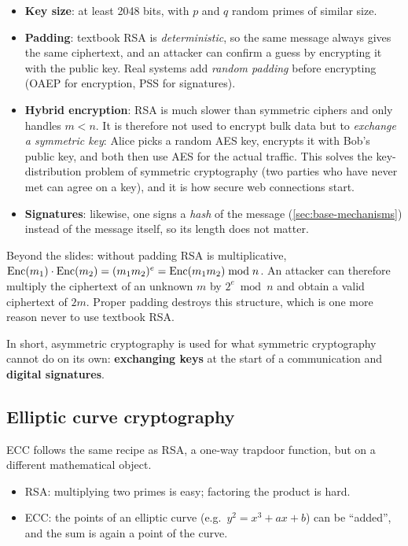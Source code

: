 \begin{itemize}
    \item \textbf{Key size}: at least 2048 bits, with $p$ and $q$ random primes of similar size.
    \item \textbf{Padding}: textbook RSA is \emph{deterministic}, so the same message always gives the same ciphertext, and an attacker can confirm a guess by encrypting it with the public key. Real systems add \emph{random padding} before encrypting (OAEP for encryption, PSS for signatures).
    \item \textbf{Hybrid encryption}: RSA is much slower than symmetric ciphers and only handles $m < n$. It is therefore not used to encrypt bulk data but to \emph{exchange a symmetric key}: Alice picks a random AES key, encrypts it with Bob's public key, and both then use AES for the actual traffic. This solves the key-distribution problem of symmetric cryptography (two parties who have never met can agree on a key), and it is how secure web connections start.
    \item \textbf{Signatures}: likewise, one signs a \emph{hash} of the message (\cref{sec:base-mechanisms}) instead of the message itself, so its length does not matter.
\end{itemize}

\begin{remark}
Beyond the slides: without padding RSA is multiplicative, $\operatorname{Enc}(m_1)\cdot\operatorname{Enc}(m_2) = (m_1 m_2)^e = \operatorname{Enc}(m_1 m_2) \bmod n$. An attacker can therefore multiply the ciphertext of an unknown $m$ by $2^e \bmod n$ and obtain a valid ciphertext of $2m$. Proper padding destroys this structure, which is one more reason never to use textbook RSA.
\end{remark}

In short, asymmetric cryptography is used for what symmetric cryptography cannot do on its own: \textbf{exchanging keys} at the start of a communication and \textbf{digital signatures}.

\subsection{Elliptic curve cryptography}

ECC follows the same recipe as RSA, a one-way trapdoor function, but on a different mathematical object.
\begin{itemize}
    \item RSA: multiplying two primes is easy; factoring the product is hard.
    \item ECC: the points of an elliptic curve (e.g.\ $y^2 = x^3 + ax + b$) can be \enquote{added}, and the sum is again a point of the curve.
\end{itemize}

